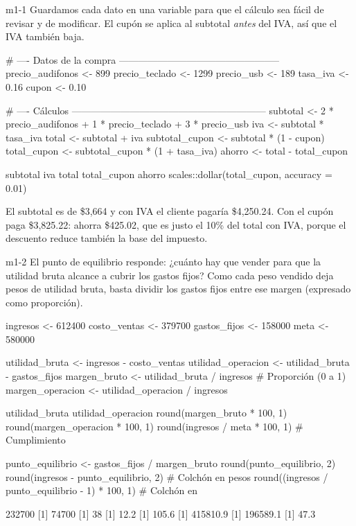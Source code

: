 
\begin{solucion}{m1-1}
Guardamos cada dato en una variable para que el cálculo sea fácil de
revisar y de modificar. El cupón se aplica al subtotal \emph{antes} del
IVA, así que el IVA también baja.
\end{solucion}

\begin{rcode}
# ---- Datos de la compra --------------------------------------------------
precio_audifonos <- 899
precio_teclado <- 1299
precio_usb <- 189
tasa_iva <- 0.16
cupon <- 0.10

# ---- Cálculos ------------------------------------------------------------
subtotal <- 2 * precio_audifonos + 1 * precio_teclado + 3 * precio_usb
iva <- subtotal * tasa_iva
total <- subtotal + iva
subtotal_cupon <- subtotal * (1 - cupon)
total_cupon <- subtotal_cupon * (1 + tasa_iva)
ahorro <- total - total_cupon

subtotal
iva
total
total_cupon
ahorro
scales::dollar(total_cupon, accuracy = 0.01)
\end{rcode}

El subtotal es de \$3,664 y con IVA el cliente pagaría \$4,250.24. Con el
cupón paga \$3,825.22: ahorra \$425.02, que es justo el 10\% del total con
IVA, porque el descuento reduce también la base del impuesto.


\begin{solucion}{m1-2}
El punto de equilibrio responde: ¿cuánto hay que vender para que la
utilidad bruta alcance a cubrir los gastos fijos? Como cada peso vendido
deja  pesos de utilidad bruta, basta dividir los
gastos fijos entre ese margen (expresado como proporción).
\end{solucion}

\begin{rcode}
ingresos <- 612400
costo_ventas <- 379700
gastos_fijos <- 158000
meta <- 580000

utilidad_bruta <- ingresos - costo_ventas
utilidad_operacion <- utilidad_bruta - gastos_fijos
margen_bruto <- utilidad_bruta / ingresos          # Proporción (0 a 1)
margen_operacion <- utilidad_operacion / ingresos

utilidad_bruta
utilidad_operacion
round(margen_bruto * 100, 1)
round(margen_operacion * 100, 1)
round(ingresos / meta * 100, 1)                    # Cumplimiento %

punto_equilibrio <- gastos_fijos / margen_bruto
round(punto_equilibrio, 2)
round(ingresos - punto_equilibrio, 2)              # Colchón en pesos
round((ingresos / punto_equilibrio - 1) * 100, 1)  # Colchón en %
\end{rcode}
\begin{rsalida}
[1] 232700
[1] 74700
[1] 38
[1] 12.2
[1] 105.6
[1] 415810.9
[1] 196589.1
[1] 47.3
\end{rsalida}

